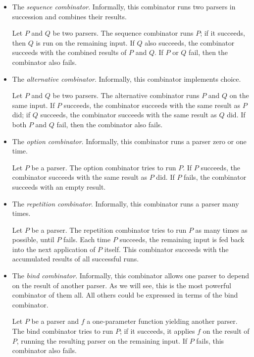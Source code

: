 \documentclass[11pt, american, draft]{PhdThesis}
\begin{document}
  \begin{itemize}[noitemsep,topsep=0pt]
    \item The \emph{sequence combinator}. Informally, this combinator runs two parsers in succession
          and combines their results.

          Let $P$ and $Q$ be two parsers. The sequence combinator runs $P$; if it succeeds, then $Q$
          is run on the remaining input. If $Q$ also succeeds, the combinator succeeds with the
          combined results of $P$ and $Q$. If $P$ or $Q$ fail, then the combinator also fails.

    \item The \emph{alternative combinator}. Informally, this combinator implements choice.

          Let $P$ and $Q$ be two parsers. The alternative combinator runs $P$ and $Q$ on the same
          input. If $P$ succeeds, the combinator succeeds with the same result as $P$ did; if $Q$
          succeeds, the combinator succeeds with the same result as $Q$ did. If both $P$ and $Q$
          fail, then the combinator also fails.

    \item The \emph{option combinator}. Informally, this combinator runs a parser zero or one time.

          Let $P$ be a parser. The option combinator tries to run $P$. If $P$ succeeds, the
          combinator succeeds with the same result as $P$ did. If $P$ fails, the combinator succeeds
          with an empty result.

    \item The \emph{repetition combinator}. Informally, this combinator runs a parser many times.

          Let $P$ be a parser. The repetition combinator tries to run $P$ as many times as possible,
          until $P$ fails. Each time $P$ succeeds, the remaining input is fed back into the next
          application of $P$ itself. This combinator succeeds with the accumulated results of all
          successful runs.

    \item The \emph{bind combinator}. Informally, this combinator allows one parser to depend on the
          result of another parser. As we will see, this is the most powerful combinator of them
          all. All others could be expressed in terms of the bind combinator.

          Let $P$ be a parser and $f$ a one-parameter function yielding
          another parser. The bind combinator tries to run $P$; if it succeeds, it applies $f$ on
          the result of $P$, running the resulting parser on the remaining input. If $P$ fails, this
          combinator also fails.
  \end{itemize}
\end{document}
